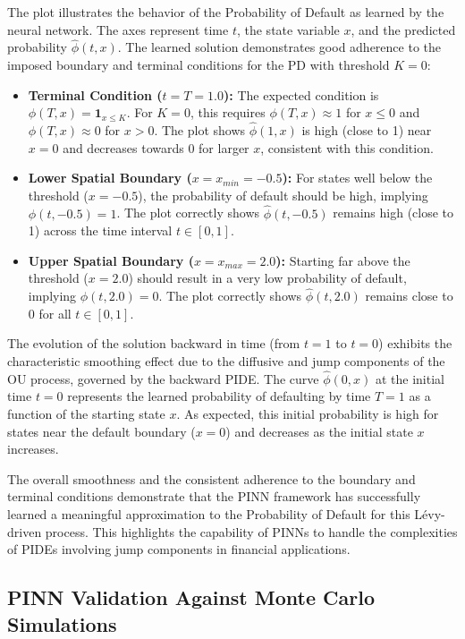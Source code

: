 \documentclass[11pt,twoside,openright]{report}
\begin{document}
The plot illustrates the behavior of the Probability of Default as learned by the neural network. The axes represent time $t$, the state variable $x$, and the predicted probability $\hat{\phi}(t, x)$. The learned solution demonstrates good adherence to the imposed boundary and terminal conditions for the PD with threshold $K=0$:

\begin{itemize}
    \item \textbf{Terminal Condition ($t=T=1.0$):} The expected condition is $\phi(T, x) = \mathbf{1}_{x \le K}$. For $K=0$, this requires $\phi(T, x) \approx 1$ for $x \le 0$ and $\phi(T, x) \approx 0$ for $x > 0$. The plot shows $\hat{\phi}(1, x)$ is high (close to 1) near $x=0$ and decreases towards 0 for larger $x$, consistent with this condition.
    \item \textbf{Lower Spatial Boundary ($x=x_{min}=-0.5$):} For states well below the threshold ($x=-0.5$), the probability of default should be high, implying $\phi(t, -0.5) = 1$. The plot correctly shows $\hat{\phi}(t, -0.5)$ remains high (close to 1) across the time interval $t \in [0, 1]$.
    \item \textbf{Upper Spatial Boundary ($x=x_{max}=2.0$):} Starting far above the threshold ($x=2.0$) should result in a very low probability of default, implying $\phi(t, 2.0) = 0$. The plot correctly shows $\hat{\phi}(t, 2.0)$ remains close to 0 for all $t \in [0, 1]$.
\end{itemize}

The evolution of the solution backward in time (from $t=1$ to $t=0$) exhibits the characteristic smoothing effect due to the diffusive and jump components of the OU process, governed by the backward PIDE. The curve $\hat{\phi}(0, x)$ at the initial time $t=0$ represents the learned probability of defaulting by time $T=1$ as a function of the starting state $x$. As expected, this initial probability is high for states near the default boundary ($x=0$) and decreases as the initial state $x$ increases.

The overall smoothness and the consistent adherence to the boundary and terminal conditions demonstrate that the PINN framework has successfully learned a meaningful approximation to the Probability of Default for this Lévy-driven process. This highlights the capability of PINNs to handle the complexities of PIDEs involving jump components in financial applications.

\subsection{PINN Validation Against Monte Carlo Simulations}
\label{sec:pinn_validation}
\end{document}
